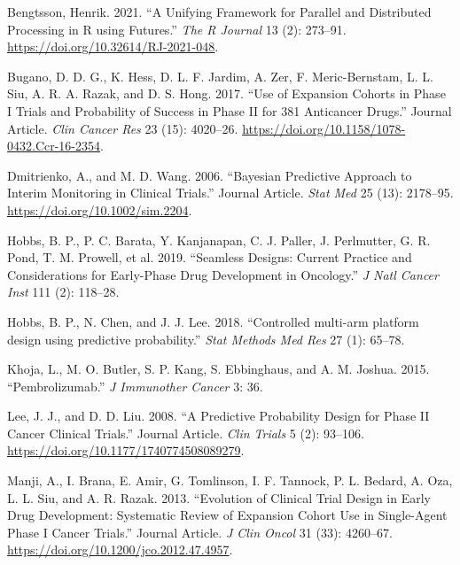 \hypertarget{refs}{}
\begin{CSLReferences}{1}{0}
\leavevmode{}%
Bengtsson, Henrik. 2021. {``{A Unifying Framework for Parallel and Distributed Processing in R using Futures}.''} \emph{{The R Journal}} 13 (2): 273--91. \url{https://doi.org/10.32614/RJ-2021-048}.

\leavevmode{}%
Bugano, D. D. G., K. Hess, D. L. F. Jardim, A. Zer, F. Meric-Bernstam, L. L. Siu, A. R. A. Razak, and D. S. Hong. 2017. {``Use of Expansion Cohorts in Phase {I} Trials and Probability of Success in Phase {II} for 381 Anticancer Drugs.''} Journal Article. \emph{Clin Cancer Res} 23 (15): 4020--26. \url{https://doi.org/10.1158/1078-0432.Ccr-16-2354}.

\leavevmode{}%
Dmitrienko, A., and M. D. Wang. 2006. {``Bayesian Predictive Approach to Interim Monitoring in Clinical Trials.''} Journal Article. \emph{Stat Med} 25 (13): 2178--95. \url{https://doi.org/10.1002/sim.2204}.

\leavevmode{}%
Hobbs, B. P., P. C. Barata, Y. Kanjanapan, C. J. Paller, J. Perlmutter, G. R. Pond, T. M. Prowell, et al. 2019. {``{{S}eamless {D}esigns: {C}urrent {P}ractice and {C}onsiderations for {E}arly-{P}hase {D}rug {D}evelopment in {O}ncology}.''} \emph{J Natl Cancer Inst} 111 (2): 118--28.

\leavevmode{}%
Hobbs, B. P., N. Chen, and J. J. Lee. 2018. {``{{C}ontrolled multi-arm platform design using predictive probability}.''} \emph{Stat Methods Med Res} 27 (1): 65--78.

\leavevmode{}%
Khoja, L., M. O. Butler, S. P. Kang, S. Ebbinghaus, and A. M. Joshua. 2015. {``{{P}embrolizumab}.''} \emph{J Immunother Cancer} 3: 36.

\leavevmode{}%
Lee, J. J., and D. D. Liu. 2008. {``A Predictive Probability Design for Phase {II} Cancer Clinical Trials.''} Journal Article. \emph{Clin Trials} 5 (2): 93--106. \url{https://doi.org/10.1177/1740774508089279}.

\leavevmode{}%
Manji, A., I. Brana, E. Amir, G. Tomlinson, I. F. Tannock, P. L. Bedard, A. Oza, L. L. Siu, and A. R. Razak. 2013. {``Evolution of Clinical Trial Design in Early Drug Development: Systematic Review of Expansion Cohort Use in Single-Agent Phase {I} Cancer Trials.''} Journal Article. \emph{J Clin Oncol} 31 (33): 4260--67. \url{https://doi.org/10.1200/jco.2012.47.4957}.


\end{CSLReferences}
